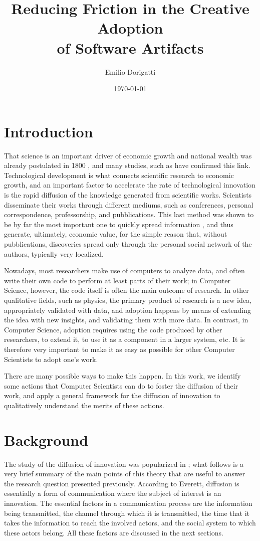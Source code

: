 \documentclass[12pt]{article}
\author{Emilio Dorigatti}
\date{\today}
\title{Reducing Friction in the Creative Adoption \\of Software Artifacts}
\begin{document}
\maketitle

\section{Introduction}
\label{sec:org6950579}
That science is an important driver of economic growth and national wealth was already postulated in 1800 \citep{marxecon}, and many studies, such as \citep{pharmaresearch} have confirmed this link. Technological development is what connects scientific research to economic growth, and an important factor to accelerate the rate of technological innovation is the rapid diffusion of the knowledge generated from scientific works. Scientists disseminate their works through different mediums, such as conferences, personal correspondence, professorship, and pubblications. This last method was shown to be by far the most important one to quickly spread information \citep{diffknowl}, and thus generate, ultimately, economic value, for the simple reason that, without pubblications, discoveries spread only through the personal social network of the authors, typically very localized.

Nowadays, most researchers make use of computers to analyze data, and often write their own code to perform at least parts of their work; in Computer Science, however, the code itself is often the main outcome of research. In other qualitative fields, such as physics, the primary product of research is a new idea, appropriately validated with data, and adoption happens by means of extending the idea with new insights, and validating them with more data. In contrast, in Computer Science, adoption requires using the code produced by other researchers, to extend it, to use it as a component in a larger system, etc. It is therefore very important to make it as easy as possible for other Computer Scientists to adopt one's work.

There are many possible ways to make this happen. In this work, we identify some actions that Computer Scientists can do to foster the diffusion of their work, and apply a general framework for the diffusion of innovation to qualitatively understand the merits of these actions.

\section{Background}
\label{sec:orgc9b1476}
The study of the diffusion of innovation was popularized in \cite{everett}; what follows is a very brief summary of the main points of this theory that are useful to answer the research question presented previously. According to Everett, diffusion is essentially a form of communication where the subject of interest is an innovation. The essential factors in a communication process are the information being transmitted, the channel through which it is transmitted, the time that it takes the information to reach the involved actors, and the social system to which these actors belong. All these factors are discussed in the next sections.
\end{document}
